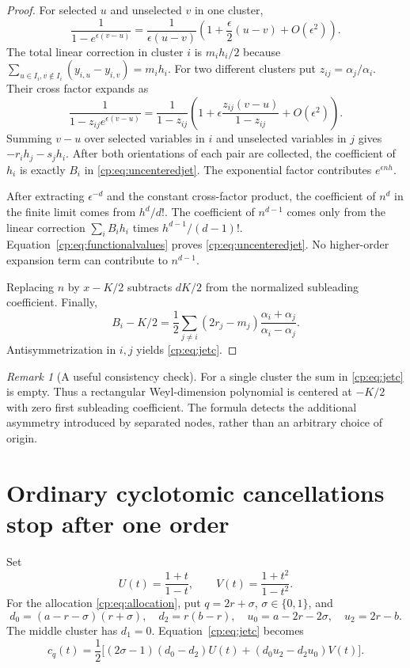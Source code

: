 \documentclass[11pt]{article}
\theoremstyle{definition}
\theoremstyle{remark}
\newtheorem{remark}[theorem]{Remark}
\theoremstyle{definition}
\theoremstyle{plain}
\numberwithin{equation}{section}
\begin{document}
\begin{proof}
For selected $u$ and unselected $v$ in one cluster,
\begin{equation}
 \frac1{1-e^{\epsilon(v-u)}}
 =\frac1{\epsilon(u-v)}
 \left(1+\frac\epsilon2(u-v)+O(\epsilon^2)\right).
 \label{cp:eq:internalexpand}
\end{equation}
The total linear correction in cluster $i$ is $m_i h_i/2$ because
$\sum_{u\in I_i,v\notin I_i}(y_{i,u}-y_{i,v})=m_i h_i$.
For two different clusters put $z_{ij}=\alpha_j/\alpha_i$. Their
cross factor expands as
\begin{equation}
 \frac1{1-z_{ij}e^{\epsilon(v-u)}}
 =\frac1{1-z_{ij}}
 \left(1+\epsilon\frac{z_{ij}(v-u)}{1-z_{ij}}+O(\epsilon^2)\right).
 \label{cp:eq:externalexpand}
\end{equation}
Summing $v-u$ over selected variables in $i$ and unselected variables in
$j$ gives $-r_i h_j-s_j h_i$. After both orientations of each pair
are collected, the coefficient of $h_i$ is exactly $B_i$ in
\eqref{cp:eq:uncenteredjet}. The exponential factor contributes
$e^{\epsilon n h}$.

After extracting $\epsilon^{-d}$ and the constant cross-factor product,
the coefficient of $n^d$ in the finite limit comes from $h^d/d!$.
The coefficient of $n^{d-1}$ comes only from the linear correction
$\sum_i B_i h_i$ times $h^{d-1}/(d-1)!$.
Equation~\eqref{cp:eq:functionalvalues} proves \eqref{cp:eq:uncenteredjet}.
No higher-order expansion term can contribute to $n^{d-1}$.

Replacing $n$ by $x-K/2$ subtracts $dK/2$ from the normalized
subleading coefficient. Finally,
\[
 B_i-K/2=\frac12\sum_{j\ne i}(2r_j-m_j)
 \frac{\alpha_i+\alpha_j}{\alpha_i-\alpha_j}.
\]
Antisymmetrization in $i,j$ yields \eqref{cp:eq:jetc}.
\end{proof}

\begin{remark}[A useful consistency check]
For a single cluster the sum in \eqref{cp:eq:jetc} is empty. Thus a rectangular
Weyl-dimension polynomial is centered at $-K/2$ with zero first subleading
coefficient. The formula detects the additional asymmetry introduced by
separated nodes, rather than an arbitrary choice of origin.
\end{remark}

\section{Ordinary cyclotomic cancellations stop after one order}
\label{cp:sec:ordinary}
Set
\begin{equation}
 U(t)=\frac{1+t}{1-t},\qquad V(t)=\frac{1+t^2}{1-t^2}.
 \label{cp:eq:UV}
\end{equation}
For the allocation \eqref{cp:eq:allocation}, put $q=2r+\sigma$,
$\sigma\in\{0,1\}$, and
\[
 d_0=(a-r-\sigma)(r+\sigma),\quad d_2=r(b-r),\quad
 u_0=a-2r-2\sigma,\quad u_2=2r-b.
\]
The middle cluster has $d_1=0$. Equation~\eqref{cp:eq:jetc} becomes
\begin{equation}
 c_q(t)=\frac12\bigl[(2\sigma-1)(d_0-d_2)U(t)
 +(d_0u_2-d_2u_0)V(t)\bigr].
 \label{cp:eq:cq}
\end{equation}
\end{document}
